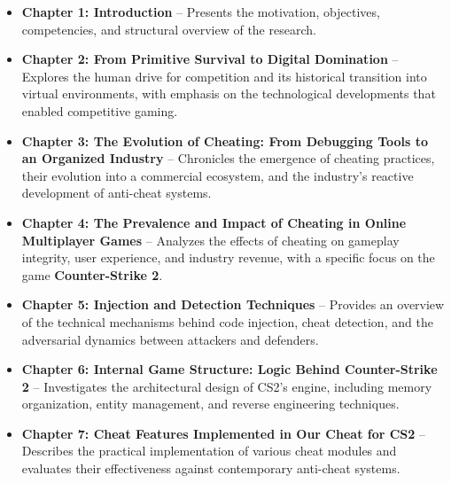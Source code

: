 \begin{itemize}
    \item \textbf{Chapter 1: Introduction} – Presents the motivation, objectives, competencies, and structural overview of the research.
    
    \item \textbf{Chapter 2: From Primitive Survival to Digital Domination} – Explores the human drive for competition and its historical transition into virtual environments, with emphasis on the technological developments that enabled competitive gaming.
    
    \item \textbf{Chapter 3: The Evolution of Cheating: From Debugging Tools to an Organized Industry} – Chronicles the emergence of cheating practices, their evolution into a commercial ecosystem, and the industry's reactive development of anti-cheat systems.
    
    \item \textbf{Chapter 4: The Prevalence and Impact of Cheating in Online Multiplayer Games} – Analyzes the effects of cheating on gameplay integrity, user experience, and industry revenue, with a specific focus on the game \textbf{Counter-Strike 2}.
    
    \item \textbf{Chapter 5: Injection and Detection Techniques} – Provides an overview of the technical mechanisms behind code injection, cheat detection, and the adversarial dynamics between attackers and defenders.
    
    \item \textbf{Chapter 6: Internal Game Structure: Logic Behind Counter-Strike 2} – Investigates the architectural design of CS2's engine, including memory organization, entity management, and reverse engineering techniques.
    
    \item \textbf{Chapter 7: Cheat Features Implemented in Our Cheat for CS2} – Describes the practical implementation of various cheat modules and evaluates their effectiveness against contemporary anti-cheat systems.
\end{itemize}